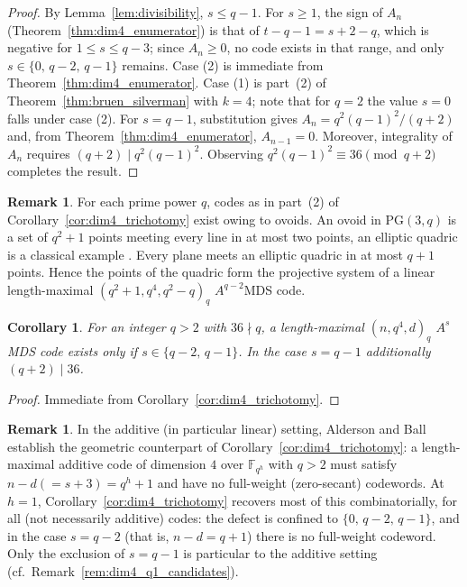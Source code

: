 \documentclass[12pt, letterpaper]{article}
\theoremstyle{plain}
\newtheorem{corollary}[theorem]{Corollary}
\theoremstyle{definition}
\newtheorem{remark}[theorem]{Remark}
\begin{document}
	\begin{proof}
		By Lemma~\ref{lem:divisibility}, $s \le q-1$. For $s \ge 1$, the sign of $A_n$ (Theorem~\ref{thm:dim4_enumerator}) is that of $t-q-1 = s+2-q$, which is negative for $1 \le s \le q-3$; since $A_n \ge 0$, no code exists in that range, and only $s \in \{0,\, q-2,\, q-1\}$ remains. Case (2) is immediate from Theorem~\ref{thm:dim4_enumerator}. Case (1) is part~(2) of Theorem~\ref{thm:bruen_silverman} with $k=4$; note that for $q = 2$ the value $s=0$ falls under case (2). For $s = q-1$, substitution gives $A_n = q^2(q-1)^2/(q+2)$ and, from Theorem~\ref{thm:dim4_enumerator}, $A_{n-1} = 0$. Moreover, integrality of $A_n$ requires $(q+2)\mid q^2(q-1)^2$. Observing  $q^2(q-1)^2 \equiv 36 \pmod{q+2}$ completes the result.
	\end{proof}
	
	\begin{remark}
		For each prime power $q$, codes as in part~(2) of Corollary~\ref{cor:dim4_trichotomy} exist owing to ovoids. An ovoid in $\mathrm{PG}(3,q)$ is a set of $q^2+1$ points meeting every line in at most two points, an elliptic quadric is a classical example \cite{Hirschfeld1985}. Every plane meets an elliptic quadric in at most $q+1$ points. Hence the points of the quadric form the projective system of a linear length-maximal $(q^2+1,q^4,q^2-q)_q$ $A^{q-2}$MDS code.
	\end{remark}


	\begin{corollary}\label{cor:dim4_existence}
		For an integer $q > 2$ with $36 \nmid q$, a length-maximal $(n,q^4,d)_q$ $A^s$MDS code exists only if $s \in \{q-2,\, q-1\}$. In the case $s=q-1$ additionally $(q+2)\mid 36$.
	\end{corollary}

	\begin{proof}
		Immediate from Corollary~\ref{cor:dim4_trichotomy}.
	\end{proof}

	\begin{remark}\label{rem:dim4_additive}
		In the additive (in particular linear) setting, Alderson and Ball \cite{alderson2026setssubspacesrestrictedhyperplane} establish the geometric counterpart of Corollary~\ref{cor:dim4_trichotomy}: a length-maximal additive code of dimension $4$ over $\mathbb F_{q^h}$ with $q>2$ must satisfy $n-d (=s+3) = q^h+1$ and have no full-weight (zero-secant) codewords. At $h=1$, Corollary~\ref{cor:dim4_trichotomy} recovers most of this combinatorially, for all (not necessarily additive) codes: the defect is confined to $\{0,\,q-2,\,q-1\}$, and in the case $s = q-2$ (that is, $n-d = q+1$) there is no full-weight codeword. Only the exclusion of $s = q-1$ is particular to the additive setting (cf.\ Remark~\ref{rem:dim4_q1_candidates}).
	\end{remark}
\end{document}
